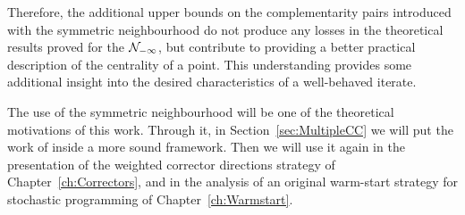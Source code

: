 Therefore, the additional upper bounds on the complementarity pairs
introduced with the symmetric neighbourhood do not produce any losses
in the theoretical results proved for the $\mathcal{N}_{-\infty}$, but 
contribute to providing a better practical description of
the centrality of a point.
This understanding provides some additional 
insight into the desired characteristics of a well-behaved iterate.

The use of the symmetric neighbourhood will be one of the theoretical
motivations of this work. Through it, in Section~\ref{sec:MultipleCC}
we will put the work of \cite{Gondzio96} inside a more sound framework.
Then we will use it again in the presentation of the weighted corrector
directions strategy of Chapter~\ref{ch:Correctors}, and in the analysis of an 
original warm-start strategy for stochastic programming of 
Chapter~\ref{ch:Warmstart}.
